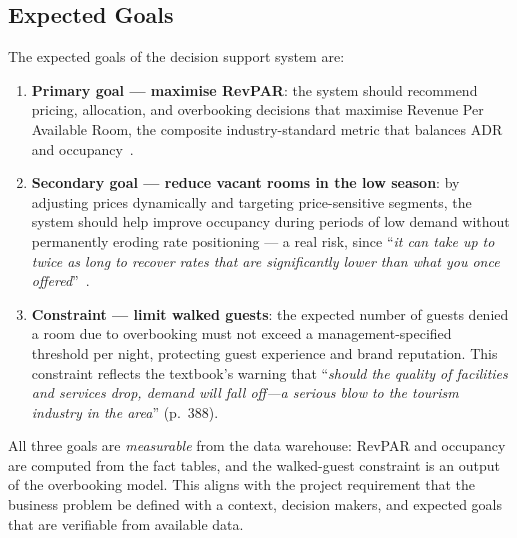\subsection{Expected Goals}

The expected goals of the decision support system are:

\begin{enumerate}
  \item \textbf{Primary goal --- maximise RevPAR}: the system should recommend pricing, allocation, and overbooking decisions that maximise Revenue Per Available Room, the composite industry-standard metric that balances ADR and occupancy~\cite{goeldner2009}.
  \item \textbf{Secondary goal --- reduce vacant rooms in the low season}: by adjusting prices dynamically and targeting price-sensitive segments, the system should help improve occupancy during periods of low demand without permanently eroding rate positioning --- a real risk, since ``\emph{it can take up to twice as long to recover rates that are significantly lower than what you once offered}''~\cite{amadeus2023}.
  \item \textbf{Constraint --- limit walked guests}: the expected number of guests denied a room due to overbooking must not exceed a management-specified threshold per night, protecting guest experience and brand reputation. This constraint reflects the textbook's warning that ``\emph{should the quality of facilities and services drop, demand will fall off---a serious blow to the tourism industry in the area}'' (p.~388).
\end{enumerate}

All three goals are \emph{measurable} from the data warehouse: RevPAR and occupancy are computed from the fact tables, and the walked-guest constraint is an output of the overbooking model. This aligns with the project requirement that the business problem be defined with a context, decision makers, and expected goals that are verifiable from available data.
